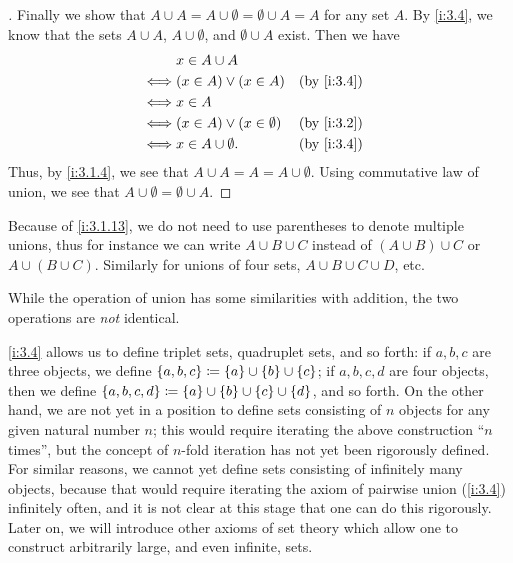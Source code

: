 \begin{proof}[]
  Finally we show that \(A \cup A = A \cup \emptyset = \emptyset \cup A = A\) for any set \(A\).
  By \cref{i:3.4}, we know that the sets \(A \cup A\), \(A \cup \emptyset\), and \(\emptyset \cup A\) exist.
  Then we have
  \begin{align*}
         & x \in A \cup A                                   \\
    \iff & (x \in A) \lor (x \in A)         &  & \by{i:3.4} \\
    \iff & x \in A                                          \\
    \iff & (x \in A) \lor (x \in \emptyset) &  & \by{i:3.2} \\
    \iff & x \in A \cup \emptyset.          &  & \by{i:3.4}
  \end{align*}
  Thus, by \cref{i:3.1.4}, we see that \(A \cup A = A = A \cup \emptyset\).
  Using commutative law of union, we see that \(A \cup \emptyset = \emptyset \cup A\).
\end{proof}

\begin{note}
  Because of \cref{i:3.1.13}, we do not need to use parentheses to denote multiple unions, thus for instance we can write \(A \cup B \cup C\) instead of \((A \cup B) \cup C\) or \(A \cup (B \cup C)\).
  Similarly for unions of four sets, \(A \cup B \cup C \cup D\), etc.
\end{note}

\begin{rmk}\label{i:3.1.14}
  While the operation of union has some similarities with addition, the two operations are \emph{not} identical.
\end{rmk}

\begin{note}
  \cref{i:3.4} allows us to define triplet sets, quadruplet sets, and so forth: if \(a, b, c\) are three objects, we define \(\left\lbrace a, b, c\right\rbrace \coloneqq \left\lbrace a\right\rbrace \cup \left\lbrace b\right\rbrace \cup \left\lbrace c\right\rbrace\);
  if \(a, b, c, d\) are four objects, then we define \(\left\lbrace a, b, c, d\right\rbrace \coloneqq \left\lbrace a\right\rbrace \cup \left\lbrace b\right\rbrace \cup \left\lbrace c\right\rbrace \cup \left\lbrace d\right\rbrace\), and so forth.
  On the other hand, we are not yet in a position to define sets consisting of \(n\) objects for any given natural number \(n\);
  this would require iterating the above construction ``\(n\) times'', but the concept of \(n\)-fold iteration has not yet been rigorously defined.
  For similar reasons, we cannot yet define sets consisting of infinitely many objects, because that would require iterating the axiom of pairwise union (\cref{i:3.4}) infinitely often, and it is not clear at this stage that one can do this rigorously.
  Later on, we will introduce other axioms of set theory which allow one to construct arbitrarily large, and even infinite, sets.
\end{note}

